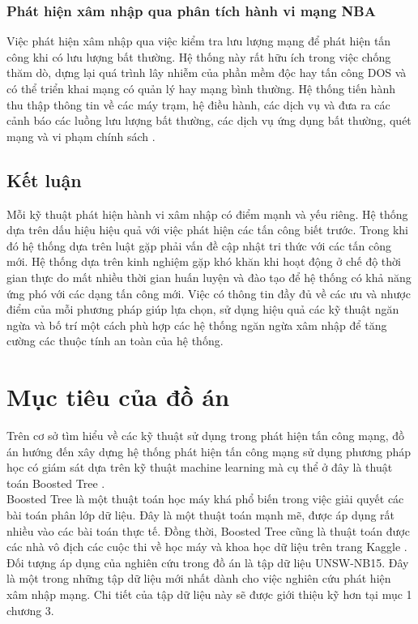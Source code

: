 \subsubsection*{Phát hiện xâm nhập qua phân tích hành vi mạng NBA}

Việc phát hiện xâm nhập qua việc kiểm tra lưu lượng mạng để phát hiện tấn công khi có lưu lượng bất thường. Hệ thống này rất hữu ích trong việc chống thăm dò, dựng lại quá trình lây nhiễm của phần mềm độc hay tấn công DOS và có thể triển khai mạng có quản lý hay mạng bình thường. Hệ thống tiến hành thu thập thông tin về các máy trạm, hệ điều hành, các dịch vụ và đưa ra các cảnh báo các luồng lưu lượng bất thường, các dịch vụ ứng dụng bất thường, quét mạng và vi phạm chính sách \cite{8}.
\subsection{Kết luận}
Mỗi kỹ thuật phát hiện hành vi xâm nhập có điểm mạnh và yếu riêng. Hệ thống dựa trên dấu hiệu hiệu quả với việc phát hiện các tấn công biết trước. Trong khi đó hệ thống dựa trên luật gặp phải vấn đề cập nhật tri thức với các tấn công mới. Hệ thống dựa trên kinh nghiệm gặp khó khăn khi hoạt động ở chế độ thời gian thực do mất nhiều thời gian huấn luyện và đào tạo để hệ thống có khả năng ứng phó với các dạng tấn công mới. Việc có thông tin đầy đủ về các ưu và nhược điểm của mỗi phương pháp giúp lựa chọn, sử dụng hiệu quả các kỹ thuật ngăn ngừa và bố trí một cách phù hợp các hệ thống ngăn ngừa xâm nhập để tăng cường các thuộc tính an toàn của hệ thống.
\section{Mục tiêu của đồ án}
Trên cơ sở tìm hiểu về các kỹ thuật sử dụng trong phát hiện tấn công mạng, đồ án hướng đến xây dựng hệ thống phát hiện tấn công mạng sử dụng phương pháp học có giám sát dựa trên kỹ thuật machine learning mà cụ thể ở đây là thuật toán Boosted Tree . \\
\indent Boosted Tree là một thuật toán học máy khá phổ biến trong việc giải quyết các bài toán phân lớp dữ liệu. Đây là một thuật toán mạnh mẽ, được áp dụng rất nhiều vào các bài toán thực tế. Đồng thời, Boosted Tree cũng là thuật toán được các nhà vô địch các cuộc thi về học máy và khoa học dữ liệu trên trang Kaggle \cite{15}. \\
\indent Đối tượng áp dụng của nghiên cứu trong đồ án là tập dữ liệu UNSW-NB15. Đây là một trong những tập dữ liệu mới nhất dành cho việc nghiên cứu phát hiện xâm nhập mạng. Chi tiết của tập dữ liệu này sẽ được giới thiệu kỹ hơn tại mục 1 chương 3.




